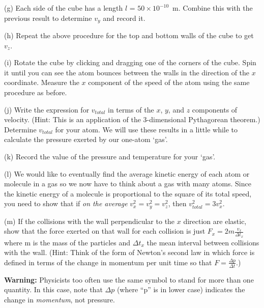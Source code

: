 (g) Each side of the cube has a length $l$ = $50 \times 10^{-10}$~m.
Combine this with the previous result to determine $v_y$ and record it.
\vspace{20mm}

(h) Repeat the above procedure for the top and bottom walls of the cube to get $v_z$.
\vspace{20mm}

(i) Rotate the cube by clicking and dragging one of the corners of the cube.
Spin it until you can see the atom bounces between the walls in the direction of
the $x$ coordinate.
Measure the $x$ component of the speed of the atom using the same procedure as before.
\vspace{20mm}

(j) Write the
expression for \( v_{total} \) in terms of the $x$, $y$, and $z$ components
of velocity. (Hint: This is an application of the 3-dimensional Pythagorean
theorem.) Determine $v_{total}$ for your atom.
We will use these results in a little while to calculate the pressure exerted by
our one-atom `gas'.
\vspace{20mm}

(k) Record the value of the pressure and temperature for your `gas'.
\vspace{20mm}

(l) We would like to eventually find the average kinetic energy of each atom or molecule
in a gas so we now have to think about a gas with many atoms.
Since the kinetic energy of a molecule is proportional to the square
of its total speed, you need to show that if \emph{on the average}
\( v_{x}^{2}=v_{y}^{2}=v_{z}^{2} \), then \( v_{total}^{2}=3v_{x}^{2} \).
\vspace{20mm}

(m) If the collisions with the wall perpendicular to the $x$ direction
are elastic, show that the force exerted on that wall for each collision
is just \( F_{x}=2m\frac{v_{x}}{\Delta t_{x}} \)where m is the mass
of the particles and \( \Delta t_{x} \) the mean interval between
collisions with the wall. (Hint: Think of the form of Newton's second
law in which force is defined in terms of the change in momentum per
unit time so that \( F=\frac{\Delta p}{\Delta t} \).)

\textbf{Warning:} Physicists too often use the same symbol to stand
for more than one quantity. In this case, note that \( \Delta p \)
(where {}``p'' is in lower case) indicates the change in \emph{momentum},
not pressure.
\vspace{20mm}

